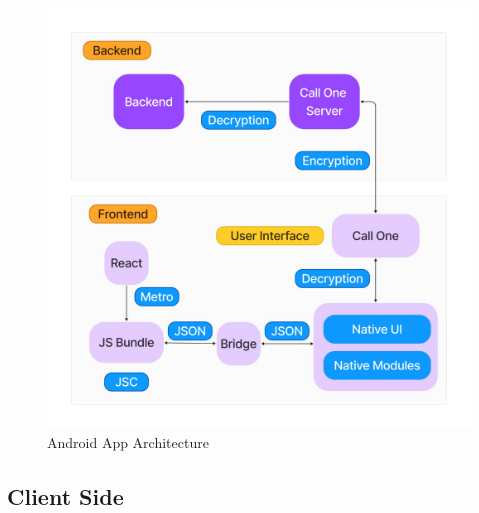 \begin{figure}
    \centering
    \includegraphics[width=1\linewidth]{Media/arch}
    \caption{Android App Architecture}
    \label{fig:React Native Architecture}
\end{figure}


\subsection{Client Side}\label{subsec:client-side}


